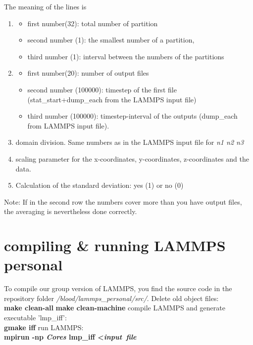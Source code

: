 \documentclass[a4paper,10pt]{scrreprt}
\begin{document}
The meaning of the lines is 
\begin{enumerate}
  \item 
  \begin{itemize}
    \item first number(32): total number of partition
    \item second number (1): the smallest number of a partition, 
    \item third number (1): interval between the numbers of the partitions
  \end{itemize} 
\item
\begin{itemize}
    \item first number(20): number of output files
    \item second number (100000): timestep of the first file (stat\_start+dump\_each from the LAMMPS input file)
    \item third number (100000): timestep-interval of the outputs (dump\_each from LAMMPS input file).
  \end{itemize}
\item domain division. Same numbers as in the LAMMPS input file for \textit{n1 n2 n3}
\item scaling parameter for the x-coordinates, y-coordinates, z-coordinates and the data.
\item Calculation of the standard deviation: yes (1) or no (0)
\end{enumerate}
Note: If in the second row the numbers cover more than you have output files, the averaging is nevertheless done correctly.

\section{compiling \& running LAMMPS personal}
To compile our group version of LAMMPS, you find the source code in the repository folder \textit{/blood/lammps\_personal/src/}.
\newline
Delete old object files:\\
\textbf{make clean-all}
\newline
\textbf{make clean-machine}
\newline
compile LAMMPS and generate executable 'lmp\_iff':\\
\textbf{gmake iff}
\newline
run LAMMPS:\\
\textbf{mpirun -np \textit{Cores} lmp\_iff \textless \quad \textit{input\ file}}
\end{document}
